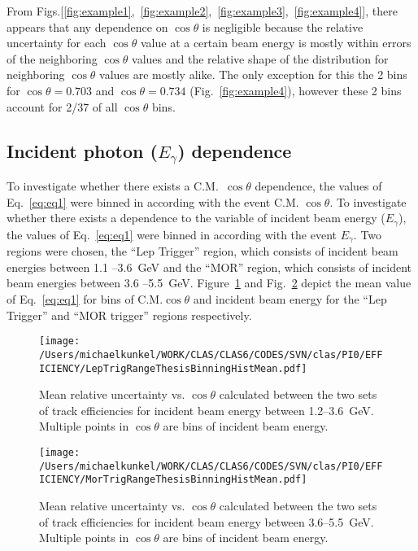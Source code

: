 \documentclass[10pt,a4paper]{report}
\newlength{\figwidth}
\newlength{\hfigheight}
\begin{document}
From Figs.[\ref{fig:example1},~\ref{fig:example2},~\ref{fig:example3},~\ref{fig:example4}], there appears that any dependence on $\cos \theta$ is negligible because the relative uncertainty for each $\cos \theta$ value at a certain beam energy is mostly within errors of the neighboring $\cos \theta$ values and the relative shape of the distribution for neighboring $\cos \theta$ values are mostly alike. The only exception for this the 2 bins for $\cos \theta = 0.703$ and $\cos \theta = 0.734$ (Fig.~\ref{fig:example4}), however these 2 bins account for 2/37 of all $\cos \theta $ bins.
\FloatBarrier
\subsection*{ Incident photon ($E_{\gamma}$) dependence}
To investigate whether there exists a C.M.~$\cos \theta$ dependence, the values of Eq.~\ref{eq:eq1} were binned in according with the event C.M. $\cos \theta$.
To investigate whether there exists a dependence to the variable of incident beam energy ($E_{\gamma}$), the values of Eq.~\ref{eq:eq1} were binned in according with the event $E_{\gamma}$. Two regions were chosen, the ``Lep Trigger'' region, which consists of incident beam energies between 1.1 --3.6~GeV and the ``MOR'' region, which consists of incident beam energies between 3.6 --5.5~GeV.
Figure~\ref{fig:leptrigcostheta} and Fig.~\ref{fig:mortrigcostheta} depict the mean value of Eq.~\ref{eq:eq1} for bins of C.M.$\cos \theta$ and incident beam energy for the ``Lep Trigger'' and ``MOR trigger'' regions respectively. 
\begin{figure}[h!]\begin{center}
		\texttt{[image: /Users/michaelkunkel/WORK/CLAS/CLAS6/CODES/SVN/clas/PI0/EFFICIENCY/LepTrigRangeThesisBinningHistMean.pdf]}
		\caption{Mean relative uncertainty vs. $\cos \theta$ calculated between the two sets of track efficiencies for incident beam energy between 1.2--3.6~GeV. Multiple points in $\cos \theta$ are bins of incident beam energy. }\label{fig:leptrigcostheta}
\end{center}\end{figure}
	
\begin{figure}[h!]\begin{center}
		\texttt{[image: /Users/michaelkunkel/WORK/CLAS/CLAS6/CODES/SVN/clas/PI0/EFFICIENCY/MorTrigRangeThesisBinningHistMean.pdf]}
		\caption{Mean relative uncertainty vs. $\cos \theta$ calculated between the two sets of track efficiencies for incident beam energy between 3.6--5.5~GeV. Multiple points in $\cos \theta$ are bins of incident beam energy.}\label{fig:mortrigcostheta}
	\end{center}\end{figure}
\end{document}
